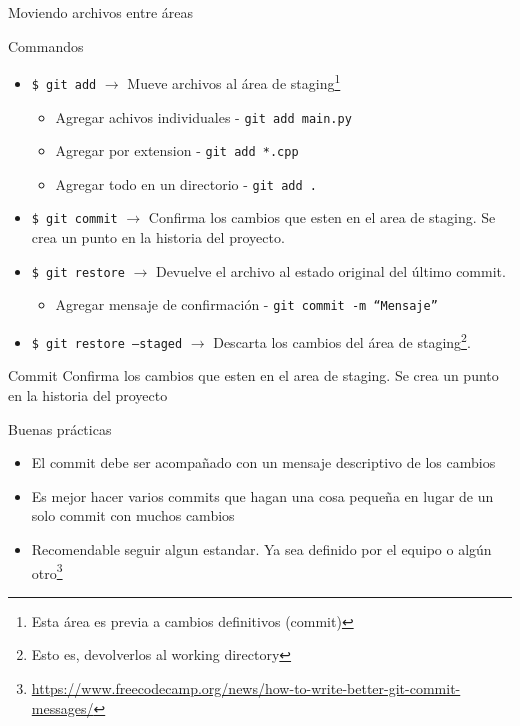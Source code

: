 \documentclass[11pt]{beamer}
\begin{document}
\begin{frame}{Moviendo archivos entre áreas}

	\begin{alertblock}{Commandos}
		\begin{itemize}
			\item <1-> \texttt{\$ git add} $\rightarrow$ Mueve archivos al área de \alert{staging}\footnote{Esta área es previa a cambios definitivos (\alert{commit})}
			\begin{itemize}
				\item Agregar achivos individuales - \texttt{git add main.py}
				\item Agregar por extension - \texttt{git add *.cpp}
				\item Agregar todo en un directorio - \texttt{git add .}
			\end{itemize} 
			\item <2-> \texttt{\$ git commit} $\rightarrow$ Confirma los cambios que esten en el area de \alert{staging}. Se crea un punto en la historia del proyecto.
			\item <3-> \texttt{\$ git restore} $\rightarrow$ Devuelve el archivo al estado original del último \alert{commit}.
			\begin{itemize}
				\item Agregar mensaje de confirmación - \texttt{git commit -m ``Mensaje''}
			\end{itemize}
			\item <4-> \texttt{\$ git restore ---staged} $\rightarrow$ Descarta los cambios del área de \alert{staging}\footnote{Esto es, devolverlos al \alert{working directory}}.
		\end{itemize}
	\end{alertblock}
\end{frame}

\begin{frame}{Commit}
	Confirma los cambios que esten en el area de staging. Se crea un punto en la historia del proyecto
	\pause
	\begin{block}{Buenas prácticas}
		\begin{itemize}
			\item El commit debe ser acompañado con un mensaje descriptivo de los cambios
			\item Es mejor hacer varios commits que hagan una cosa pequeña en lugar de un solo commit con muchos cambios
			\item Recomendable seguir algun estandar. Ya sea definido por el equipo o algún otro\footnote{\url{https://www.freecodecamp.org/news/how-to-write-better-git-commit-messages/}}
		\end{itemize}		
	\end{block}
\end{frame}
\end{document}
